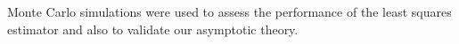 \documentclass[journal]{IEEEtran}
\begin{document}
Monte Carlo simulations were used to assess the performance of the least squares estimator and also to validate our asymptotic theory.  %

\small


\normalsize
\appendix 






 
\end{document}
